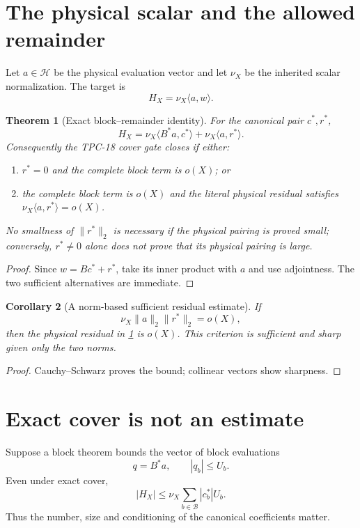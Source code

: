 \documentclass[11pt]{article}
\newtheorem{theorem}{Theorem}[section]
\newtheorem{corollary}[theorem]{Corollary}
\theoremstyle{definition}
\theoremstyle{remark}
\newcommand{\Block}{\mathcal B}
\begin{document}
\section{The physical scalar and the allowed remainder}

Let \(a\in\mathcal H\) be the physical evaluation vector and let
\(\nu_X\) be the inherited scalar normalization.  The target is
\[
 H_X=\nu_X\langle a,w\rangle.
\]

\begin{theorem}[Exact block--remainder identity]
\label{thm:physical}
For the canonical pair \(c^*,r^*\),
\[
 \boxed{\quad
 H_X
 =\nu_X\langle B^*a,c^*\rangle
  +\nu_X\langle a,r^*\rangle.
 \quad}
\]
Consequently the TPC-18 cover gate closes if either:
\begin{enumerate}[label=(\alph*),leftmargin=2em]
\item \(r^*=0\) and the complete block term is \(o(X)\); or
\item the complete block term is \(o(X)\) and the literal physical
  residual satisfies
  \(\nu_X\langle a,r^*\rangle=o(X)\).
\end{enumerate}
No smallness of \(\|r^*\|_2\) is necessary if the physical pairing is
proved small; conversely, \(r^*\ne0\) alone does not prove that its
physical pairing is large.
\end{theorem}

\begin{proof}
Since \(w=Bc^*+r^*\), take its inner product with \(a\) and use
adjointness.  The two sufficient alternatives are immediate.
\end{proof}

\begin{corollary}[A norm-based sufficient residual estimate]
If
\[
 \nu_X\|a\|_2\|r^*\|_2=o(X),
\]
then the physical residual in \cref{thm:physical} is \(o(X)\).
This criterion is sufficient and sharp given only the two norms.
\end{corollary}

\begin{proof}
Cauchy--Schwarz proves the bound; collinear vectors show sharpness.
\end{proof}

\section{Exact cover is not an estimate}

Suppose a block theorem bounds the vector of block evaluations
\[
 q=B^*a,\qquad |q_b|\le U_b.
\]
Even under exact cover,
\[
 |H_X|
 \le\nu_X\sum_{b\in\Block}|c_b^*|U_b.
\]
Thus the number, size and conditioning of the canonical coefficients
matter.
\end{document}
